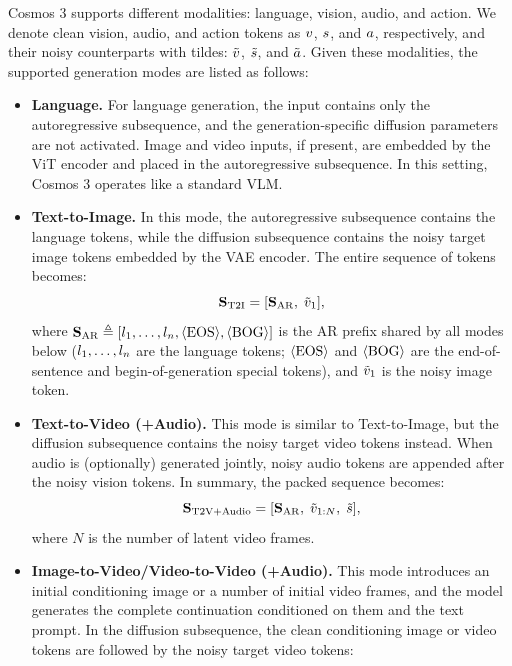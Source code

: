 Cosmos 3 supports different modalities: language, vision, audio, and action.
We denote clean vision, audio, and action tokens as $v$, $s$, and $a$, respectively, and their noisy counterparts with tildes: $\tilde{v}$, $\tilde{s}$, and $\tilde{a}$.
Given these modalities, the supported generation modes are listed as follows:
\begin{itemize}
    \item \textbf{Language.} For language generation, the input contains only the autoregressive subsequence, and the generation-specific diffusion parameters are not activated. Image and video inputs, if present, are embedded by the ViT encoder and placed in the autoregressive subsequence. In this setting, Cosmos 3 operates like a standard VLM.
    \item \textbf{Text-to-Image.} In this mode, the autoregressive subsequence contains the language tokens, while the diffusion subsequence contains the noisy target image tokens embedded by the VAE encoder. The entire sequence of tokens becomes:
    \begin{equation}
    \mathbf{S}_{\mathrm{T2I}} = [\mathbf{S}_{\mathrm{AR}},\; \tilde{v}_{1}],
    \end{equation}
    where $\mathbf{S}_{\mathrm{AR}} \triangleq [l_{1},\ldots,l_{n}, \langle\text{EOS}\rangle, \langle\text{BOG}\rangle]$ is the AR prefix shared by all modes below ($l_{1},\ldots,l_{n}$ are the language tokens; $\langle\text{EOS}\rangle$ and $\langle\text{BOG}\rangle$ are the end-of-sentence and begin-of-generation special tokens), and $\tilde{v}_{1}$ is the noisy image token.
    \item \textbf{Text-to-Video (+Audio).} This mode is similar to Text-to-Image, but the diffusion subsequence contains the noisy target video tokens instead. When audio is (optionally) generated jointly, noisy audio tokens are appended after the noisy vision tokens. In summary, the packed sequence becomes:
    \begin{equation}
    \mathbf{S}_{\mathrm{T2V+Audio}} = [\mathbf{S}_{\mathrm{AR}},\; \tilde{v}_{1:N},\; \tilde{s}],
    \end{equation}
    where $N$ is the number of latent video frames.

    \item \textbf{Image-to-Video/Video-to-Video (+Audio).} This mode introduces an initial conditioning image or a number of initial video frames, and the model generates the complete continuation conditioned on them and the text prompt. In the diffusion subsequence, the clean conditioning image or video tokens are followed by the noisy target video tokens:


\end{itemize}
